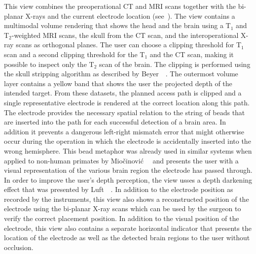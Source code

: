 This  view combines the preoperational CT and MRI scans together with the bi-planar X-rays and the current electrode location (see~).  The view contains a multimodal volume rendering that shows the head and the brain using a T$_1$ and T$_2$-weighted MRI scans, the skull from the CT scan, and the interoperational X-ray scans as orthogonal planes.  The user can choose a clipping threshold for T$_1$ scan and a second clipping threshold for the T$_1$ and the CT scan, making it possible to inspect only the T$_2$ scan of the brain.  The clipping is performed using the skull stripping algorithm as described by Beyer~\etal~\cite{beyer2007high}.  The outermost volume layer contains a yellow band that shows the user the projected depth of the intended target.  From these datasets, the planned access path is clipped and a single representative electrode is rendered at the correct location along this path.  The electrode provides the necessary spatial relation to the string of beads that are inserted into the path for each successful detection of a brain area.  In addition it prevents a dangerous left-right mismatch error that might otherwise occur during the operation in which the electrode is accidentally inserted into the wrong hemisphere.  This bead metaphor was already used in similar systems when applied to non-human primates by Mio\v{c}inovi\'{c}~\etal~\cite{miocinovic2007stereotactic} and presents the user with a visual representation of the various brain region the electrode has passed through.  In order to improve the user's depth perception, the view usses a depth darkening effect that was presented by Luft~\etal~\cite{luft2006image}.  In addition to the electrode position as recorded by the instruments, this view also shows a reconstructed position of the electrode using the bi-planar X-ray scans which can be used by the surgeon to verify the correct placement position.  In addition to the visual position of the electrode, this view also contains a separate horizontal indicator that presents the location of the electrode as well as the detected brain regions to the user without occlusion.



